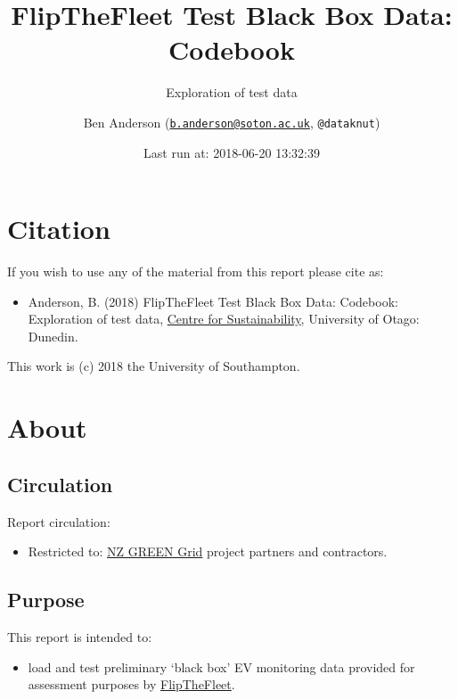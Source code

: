 \documentclass[]{article}
\title{FlipTheFleet Test Black Box Data: Codebook}
\subtitle{Exploration of test data}
\author{Ben Anderson
(\href{mailto:b.anderson@soton.ac.uk}{\nolinkurl{b.anderson@soton.ac.uk}},
\texttt{@dataknut})}
\date{Last run at: 2018-06-20 13:32:39}
\providecommand{\tightlist}{%
  \setlength{\itemsep}{0pt}\setlength{\parskip}{0pt}}
\begin{document}
\maketitle

{
\setcounter{tocdepth}{2}
\tableofcontents
}
\newpage

\section{Citation}\label{citation}

If you wish to use any of the material from this report please cite as:

\begin{itemize}
\tightlist
\item
  Anderson, B. (2018) FlipTheFleet Test Black Box Data: Codebook:
  Exploration of test data,
  \href{http://www.otago.ac.nz/centre-sustainability/}{Centre for
  Sustainability}, University of Otago: Dunedin.
\end{itemize}

This work is (c) 2018 the University of Southampton.

\newpage

\section{About}\label{about}

\subsection{Circulation}\label{circulation}

Report circulation:

\begin{itemize}
\tightlist
\item
  Restricted to:
  \href{https://www.otago.ac.nz/centre-sustainability/research/energy/otago050285.html}{NZ
  GREEN Grid} project partners and contractors.
\end{itemize}

\subsection{Purpose}\label{purpose}

This report is intended to:

\begin{itemize}
\tightlist
\item
  load and test preliminary `black box' EV monitoring data provided for
  assessment purposes by \href{http://flipthefleet.org/}{FlipTheFleet}.
\end{itemize}
\end{document}
